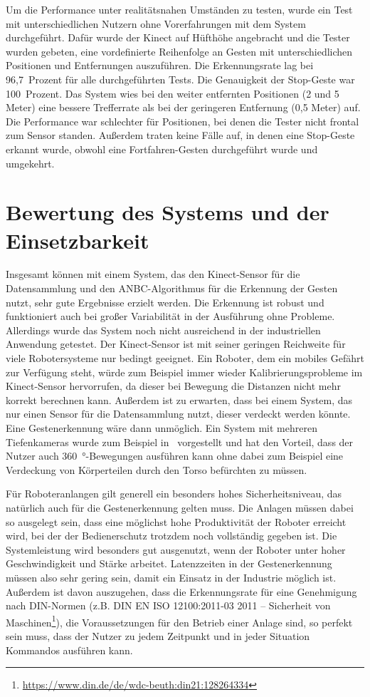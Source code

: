 Um die Performance unter realitätsnahen Umständen zu testen, wurde ein Test mit unterschiedlichen Nutzern ohne Vorerfahrungen mit dem System durchgeführt. Dafür wurde der Kinect auf Hüfthöhe angebracht und die Tester wurden gebeten, eine vordefinierte Reihenfolge an Gesten mit unterschiedlichen Positionen und Entfernungen auszuführen. Die Erkennungsrate lag bei 96,7~Prozent für alle durchgeführten Tests. Die Genauigkeit der Stop-Geste war 100~Prozent. Das System wies bei den weiter entfernten Positionen (2 und 5 Meter) eine bessere Trefferrate als bei der geringeren Entfernung (0,5 Meter) auf. Die Performance war schlechter für Positionen, bei denen die Tester nicht frontal zum Sensor standen. Außerdem traten keine Fälle auf, in denen eine Stop-Geste erkannt wurde, obwohl eine Fortfahren-Gesten durchgeführt wurde und umgekehrt.~\cite{flexibleSystem}

\section{Bewertung des Systems und der Einsetzbarkeit}
Insgesamt können mit einem System, das den Kinect-Sensor für die Datensammlung und den ANBC-Algorithmus für die Erkennung der Gesten nutzt, sehr gute Ergebnisse erzielt werden. Die Erkennung ist robust und funktioniert auch bei großer Variabilität in der Ausführung ohne Probleme. Allerdings wurde das System noch nicht ausreichend in der industriellen Anwendung getestet. Der Kinect-Sensor ist mit seiner geringen Reichweite für viele Robotersysteme nur bedingt geeignet. Ein Roboter, dem ein mobiles Gefährt zur Verfügung steht, würde zum Beispiel immer wieder Kalibrierungsprobleme im Kinect-Sensor hervorrufen, da dieser bei Bewegung die Distanzen nicht mehr korrekt berechnen kann. Außerdem ist zu erwarten, dass bei einem System, das nur einen Sensor für die Datensammlung nutzt, dieser verdeckt werden könnte. Eine Gestenerkennung wäre dann unmöglich. Ein System mit mehreren Tiefenkameras wurde zum Beispiel in~\cite{multipleDepthCameras} vorgestellt und hat den Vorteil, dass der Nutzer auch \SI{360}{\degree}-Bewegungen ausführen kann ohne dabei zum Beispiel eine Verdeckung von Körperteilen durch den Torso befürchten zu müssen.

Für Roboteranlangen gilt generell ein besonders hohes Sicherheitsniveau, das natürlich auch für die Gestenerkennung gelten muss. Die Anlagen müssen dabei so ausgelegt sein, dass eine möglichst hohe Produktivität der Roboter erreicht wird, bei der der Bedienerschutz trotzdem noch vollständig gegeben ist. Die Systemleistung wird besonders gut ausgenutzt, wenn der Roboter unter hoher Geschwindigkeit und Stärke arbeitet. Latenzzeiten in der Gestenerkennung müssen also sehr gering sein, damit ein Einsatz in der Industrie möglich ist. Außerdem ist davon auszugehen, dass die Erkennungsrate für eine Genehmigung nach DIN-Normen (z.B. DIN EN ISO 12100:2011-03 2011 -- Sicherheit von Maschinen\footnote{\url{https://www.din.de/de/wdc-beuth:din21:128264334}}), die Voraussetzungen für den Betrieb einer Anlage sind, so perfekt sein muss, dass der Nutzer zu jedem Zeitpunkt und in jeder Situation Kommandos ausführen kann.~\cite{ObererTreitz.2019}
